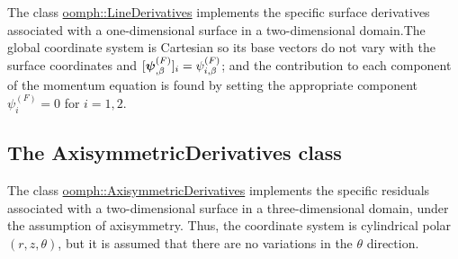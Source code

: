 The class \hyperlink{classoomph_1_1LineDerivatives}{oomph\+::\+Line\+Derivatives} implements the specific surface derivatives associated with a one-\/dimensional surface in a two-\/dimensional domain.\+The global coordinate system is Cartesian so its base vectors do not vary with the surface coordinates and $ [\mbox{\boldmath$\psi$}_{,\beta}^{(F)}]_{i} = \psi^{(F)}_{i,\beta}$; and the contribution to each component of the momentum equation is found by setting the appropriate component $ \psi^{(F)}_{i} = 0$ for $ i = 1,2 $.\hypertarget{index_axi}{}\subsection{The Axisymmetric\+Derivatives class}\label{index_axi}
The class \hyperlink{classoomph_1_1AxisymmetricDerivatives}{oomph\+::\+Axisymmetric\+Derivatives} implements the specific residuals associated with a two-\/dimensional surface in a three-\/dimensional domain, under the assumption of axisymmetry. Thus, the coordinate system is cylindrical polar $(r,z,\theta)$, but it is assumed that there are no variations in the $ \theta $ direction.


